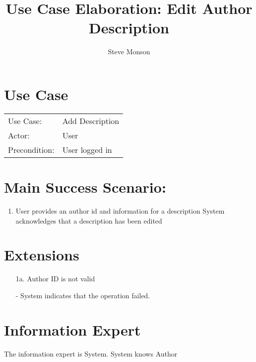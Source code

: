 \documentclass{article}
\title{Use Case Elaboration: Edit Author Description}
\author{ Steve Monson }
\begin{document}
\maketitle


\section*{Use Case}
\begin{tabular}{l l}
Use Case:     & Add Description\\
Actor:        & User\\
Precondition: & User logged in\\
\end{tabular}


\section*{Main Success Scenario:}

\begin{enumerate}
    \item User provides an author id and information for a description
    \itme System acknowledges that a description has been edited
 
\end{enumerate}

\section*{Extensions}

\begin{itemize}
    \item [1a.] Author ID is not valid
    
         - System indicates that the operation failed.
                            
\end{itemize}


\section*{Information Expert}
The information expert is System. System knows Author
\end{document}
